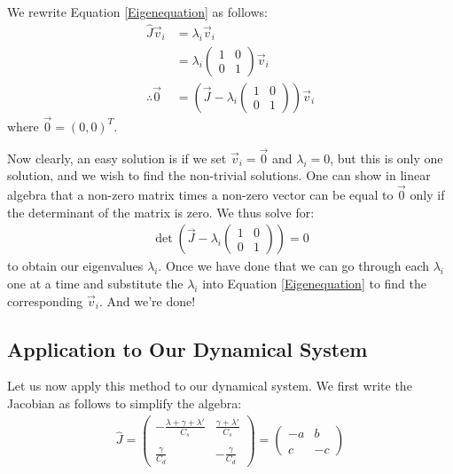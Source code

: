 We rewrite Equation \ref{Eigenequation} as follows:
\begin{align*}
    \hat{J}\vec{v}_i&=\lambda_i\vec{v}_i\\
    &=\lambda_i\left( \begin{array}{cc}
        1 & 0 \\
        0 & 1
    \end{array} \right)\vec{v}_i\\
    \therefore \vec{0} & = \left( 
        \vec{J} - \lambda_i \left( \begin{array}{cc}
        1 & 0 \\
        0 & 1
    \end{array} \right)
    \right)\vec{v}_i
\end{align*}
where $\vec{0}=(0,0)^T$. 

Now clearly, an easy solution is if we set $\vec{v}_i=\vec{0}$ and $\lambda_i=0$, but this is only one solution, and we wish to find the non-trivial solutions. One can show in linear algebra that a non-zero matrix times a non-zero vector can be equal to $\vec{0}$ only if the determinant of the matrix is zero. We thus solve for:
\begin{align*}
    \det\left( 
        \vec{J} - \lambda_i \left( \begin{array}{cc}
        1 & 0 \\
        0 & 1
    \end{array} \right)
    \right)=0
\end{align*}
to obtain our eigenvalues $\lambda_i$. Once we have done that we can go through each $\lambda_i$ one at a time and substitute the $\lambda_i$ into Equation \ref{Eigenequation} to find the corresponding $\vec{v}_i$. And we're done!

\subsection{Application to Our Dynamical System}\label{App to Dym}

Let us now apply this method to our dynamical system. We first write the Jacobian as follows to simplify the algebra:
\begin{align*}
    \hat{J}=\left( \begin{array}{cc}
        -\frac{\lambda+\gamma+\lambda'}{C_s} & \frac{\gamma+\lambda'}{C_s} \\\\
        \frac{\gamma}{C_d} & -\frac{\gamma}{C_d}
    \end{array}
    \right)
    =\left( \begin{array}{cc}
        -a & b \\\\
        c & -c
    \end{array}
    \right)
\end{align*}

